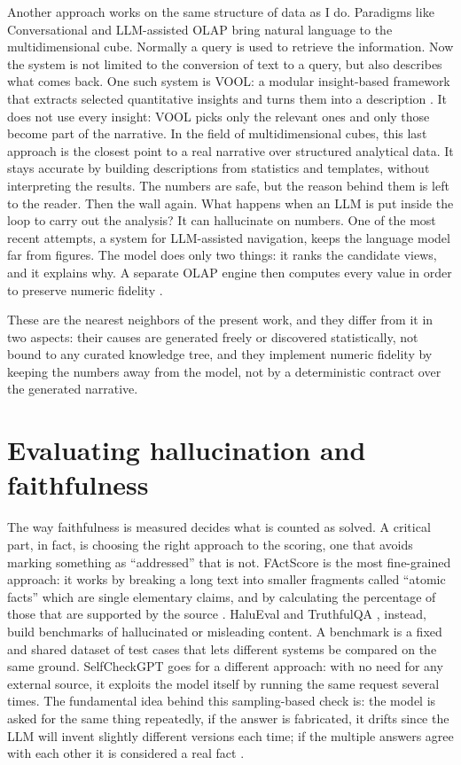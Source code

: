 \documentclass[12pt,a4paper,openright,twoside]{book}
\begin{document}
Another approach works on the same structure of data as I do. 
Paradigms like Conversational and \ac{LLM}-assisted \ac{OLAP} bring natural language to the multidimensional cube.
Normally a query is used to retrieve the information. Now the system is not limited to the conversion of text to a query, but also describes what comes back.
One such system is \ac{VOOL}: a modular insight-based framework that extracts selected quantitative insights and turns them into a description \cite{francia2025vool}. 
It does not use every insight: VOOL picks only the relevant ones and only those become part of the narrative.
In the field of multidimensional cubes, this last approach is the closest point to a real narrative over structured analytical data.
It stays accurate by building descriptions from statistics and templates, without interpreting the results. 
The numbers are safe, but the reason behind them is left to the reader.
Then the wall again. What happens when an \ac{LLM} is put inside the loop to carry out the analysis? It can hallucinate on numbers. One of the most recent attempts, a system for \ac{LLM}-assisted navigation, keeps the language model far from figures. 
The model does only two things: it ranks the candidate views, and it explains why. A separate \ac{OLAP} engine then computes every value in order to preserve numeric fidelity \cite{liu2026llmolap}.


These are the nearest neighbors of the present work, and they differ from it in two aspects: their causes are generated freely or discovered statistically, not bound to any curated knowledge tree, and
they implement numeric fidelity by keeping the numbers away from the model, not by a deterministic contract over the generated narrative.
\section{Evaluating hallucination and faithfulness}
The way faithfulness is measured decides what is counted as solved. A critical part, in fact, is choosing the right approach to the scoring, one that avoids marking something as \enquote{addressed} that is not.
FActScore is the most fine-grained approach: it works by breaking a long text into smaller fragments called \enquote{atomic facts} which are single elementary claims, and by calculating the percentage of those that are supported by the source \cite{min2023factscore}.
HaluEval \cite{li2023halueval} and TruthfulQA \cite{lin2022truthfulqa}, instead, build benchmarks of hallucinated or misleading content. A benchmark is a fixed and shared dataset of test cases that lets different systems be compared on the same ground.
SelfCheckGPT goes for a different approach: with no need for any external source, it exploits the model itself by running the same request several times. 
The fundamental idea behind this sampling-based check is: the model is asked for the same thing repeatedly, if the answer is fabricated, it drifts since the \ac{LLM} will invent slightly different versions each time; if the multiple answers agree with each other it is considered a real fact  \cite{manakul2023selfcheckgpt}.
\end{document}
